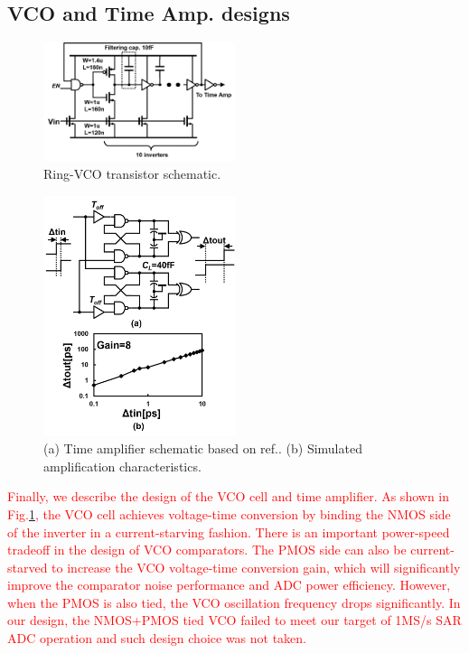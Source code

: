 \documentclass[journal]{IEEEtran}
\begin{document}
\subsection{VCO and Time Amp. designs}
\begin{figure}[!]
\centering
 \includegraphics[width=0.5\textwidth]{figs/vco_cell.png}
  \caption{Ring-VCO transistor schematic.}
  \label{cell}
\end{figure}

\begin{figure}[!]
\centering
 \includegraphics[width=0.5\textwidth]{figs/ta_chara.png}
  \caption{(a) Time amplifier schematic based on ref.\cite{timecomp}. (b) Simulated amplification characteristics.}
  \label{timeamp}
\end{figure}

\textcolor{red}{Finally, we describe the design of the VCO cell and time amplifier. As shown in Fig.\ref{cell}, the VCO cell achieves voltage-time conversion by binding the NMOS side of the inverter in a current-starving fashion. 
There is an important power-speed tradeoff in the design of VCO comparators. The PMOS side can also be current-starved to increase the VCO voltage-time conversion gain\cite{shim2017edge}\cite{timecomp}, which will significantly improve the comparator noise performance and ADC power efficiency. However, when the PMOS is also tied, the VCO oscillation frequency drops significantly. In our design, the NMOS+PMOS tied VCO failed to meet our target of 1MS/s SAR ADC operation and such design choice was not taken.}
\end{document}
